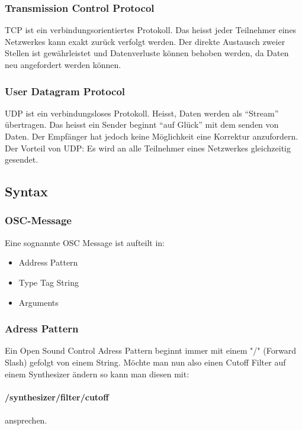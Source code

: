 \documentclass[a4paper, 12pt]{article}
\begin{document}
\subsubsection{Transmission Control Protocol}
TCP ist ein verbindungsorientiertes Protokoll. Das heisst jeder Teilnehmer eines Netzwerkes kann exakt zurück verfolgt werden. Der direkte Austausch zweier Stellen ist gewährleistet und Datenverluste können behoben werden, da Daten neu angefordert werden können.

\subsubsection{User Datagram Protocol}
UDP ist ein verbindungsloses Protokoll. Heisst, Daten werden als “Stream” übertragen. Das heisst ein Sender beginnt “auf Glück” mit dem senden von Daten. Der Empfänger hat jedoch keine Möglichkeit eine Korrektur anzufordern. Der Vorteil von UDP: Es wird an alle Teilnehmer eines Netzwerkes gleichzeitig gesendet.
\newpage
\subsection{Syntax}
\subsubsection{OSC-Message}
Eine sognannte OSC Message ist aufteilt in:
\begin{itemize}
  \item Address Pattern
  \item Type Tag String
  \item Arguments
\end{itemize}
\subsubsection{Adress Pattern}
Ein Open Sound Control Adress Pattern beginnt immer mit einem "/" (Forward Slash) gefolgt von einem String. Möchte man nun also einen Cutoff Filter auf einem Synthesizer ändern so kann man diesen mit:\\
\\
{\bf /synthesizer/filter/cutoff } \\
\\
ansprechen.
\end{document}
